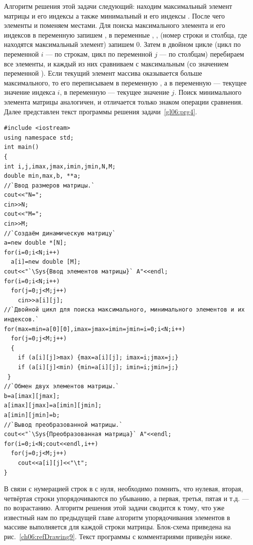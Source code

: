 
Алгоритм решения этой задачи следующий: находим максимальный элемент матрицы  и его индексы
 а также минимальный  и его индексы . После
чего элементы  и  поменяем местами. Для поиска максимального 
элемента и его индексов в
переменную  запишем , в переменные , , (номер
строки и столбца, где находятся максимальный элемент) запишем 0. Затем в двойном цикле 
(цикл по переменной $i$ ---
по строкам, цикл по переменной $j$ --- по столбцам) перебираем все элементы, и каждый из них сравниваем с
максимальным (со значением переменной ). Если текущий элемент массива оказывается больше
максимального, то его переписываем в переменную , а в переменную  --- текущее
значение индекса $i$, в переменную  --- текущее значение $j$. Поиск минимального элемента
матрицы аналогичен, и отличается только знаком операции сравнения. Далее представлен текст программы решения задачи~\ref{gl06:prg4}.
\begin{lstlisting}
#include <iostream>
using namespace std;
int main()
{
int i,j,imax,jmax,imin,jmin,N,M;
double min,max,b, **a; 
//`Ввод размеров матрицы.` 
cout<<"N=";
cin>>N;
cout<<"M=";
cin>>M;
//`Создаём динамическую матрицу`
a=new double *[N];
for(i=0;i<N;i++)
  a[i]=new double [M];
cout<<"`\Sys{Ввод элементов матрицы}` A"<<endl;
for(i=0;i<N;i++)
  for(j=0;j<M;j++)
    cin>>a[i][j];
//`Двойной цикл для поиска максимального, минимального элементов и их индексов.`
for(max=min=a[0][0],imax=jmax=imin=jmin=i=0;i<N;i++)
  for(j=0;j<M;j++)
  {
    if (a[i][j]>max) {max=a[i][j]; imax=i;jmax=j;}
    if (a[i][j]<min) {min=a[i][j]; imin=i;jmin=j;}
 }
//`Обмен двух элементов матрицы.`
b=a[imax][jmax];
a[imax][jmax]=a[imin][jmin];
a[imin][jmin]=b;
//`Вывод преобразованной матрицы.` 
cout<<"`\Sys{Преобразованная матрица}` A"<<endl;
for(i=0;i<N;cout<<endl,i++)
  for(j=0;j<M;j++)
    cout<<a[i][j]<<"\t";
}
\end{lstlisting}


В связи с нумерацией строк в  с нуля, необходимо помнить, что нулевая, 
вторая, четвёртая строки упорядочиваются по
убыванию, а первая, третья, пятая и т.д. --- по возрастанию. Алгоритм решения 
этой задачи сводится к тому, что уже
известный нам по предыдущей главе алгоритм упорядочивания элементов в массиве 
выполняется для каждой строки матрицы.
Блок-схема приведена на рис.~\ref{ch06:refDrawing9}. Текст программы с комментариями приведён ниже.

